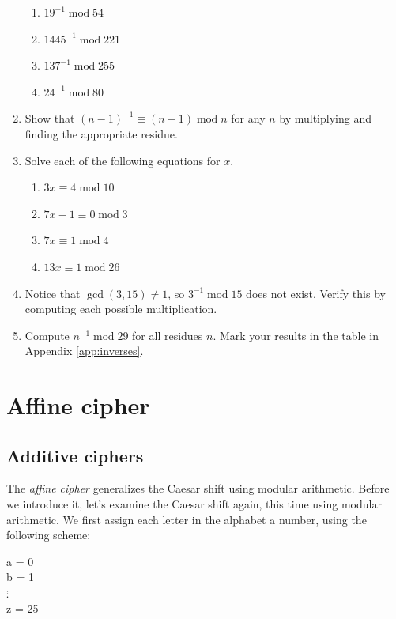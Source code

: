 \documentclass{book}
\theoremstyle{plain}
\theoremstyle{definition}
\newif\ifprintsolutions
\newcommand{\solution}[1]{\ifprintsolutions \begin{sloppypar}{\it #1}\end{sloppypar} \fi} %
\renewcommand{\mod}{\operatorname{mod}}
\renewcommand{\mod}{\operatorname{mod}}
\begin{document}
\begin{enumerate}
\begin{enumerate}
\item $19^{-1} \mod 54$ \solution{$37$}
\item $1445^{-1} \mod 221$ \solution{does not exist}
\item $137^{-1} \mod 255$ \solution{$188$}
\item $24^{-1} \mod 80$ \solution{does not exist}
\end{enumerate}
\item Show that $(n-1)^{-1} \equiv (n-1) \mod n$ for any $n$ by multiplying and finding the appropriate residue.
\item Solve each of the following equations for $x$.
\begin{enumerate}
\item $3x \equiv 4 \mod 10$ \solution{$x \equiv 8 \mod 10$}
\item $7x-1 \equiv 0 \mod 3$ \solution{$x \equiv 1 \mod 3$}
\item $7x \equiv 1 \mod 4$ \solution{$x \equiv 3 \mod 4$}
\item $13x \equiv 1 \mod 26$ \solution{does not exist}
\end{enumerate}
\item Notice that $\gcd(3,15) \neq 1$, so $3^{-1} \mod 15$ does not exist. Verify this by computing each possible multiplication.
\item Compute $n^{-1} \mod 29$ for all residues $n$. Mark your results in the table in Appendix \ref{app:inverses}. \solution{
\def\arraystretch{1.5}
\begin{tabular}{|c|c|c|c|c|c|c|c|c|c|c|c|c|c|c|}
\hline
$n$ & $1$ & $2$ & $3$ & $4$ & $5$ & $6$ & $7$ & $8$ & $9$ & $10$ & $11$ & $12$ & $13$ & $14$ \\
\hline
$n^{-1} \mod 29$ & $1$ & $15$ & $10$ & $22$ & $6$ & $5$ & $25$ & $11$ & $13$ & $3$ & $8$ & $17$ & $9$ & $27$ \\
\hline
$n$ & $15$ & $16$ & $17$ & $18$ & $19$ & $20$ & $21$ & $22$ & $23$ & $24$ & $25$ & $26$ & $27$ & $28$ \\
\hline
$n^{-1} \mod 29$ & $2$ & $20$ & $12$ & $21$ & $26$ & $16$ & $18$ & $4$ & $24$ & $23$ & $7$ & $19$ & $14$ & $28$ \\
\hline
\end{tabular}
\def\arraystretch{1.0}
}
\end{enumerate}

\chapter{Affine cipher}
\section{Additive ciphers}
The {\it affine cipher} generalizes the Caesar shift using modular arithmetic. Before we introduce it, let's examine the Caesar shift again, this time using modular arithmetic. We first assign each letter in the alphabet a number, using the following scheme:
\begin{center}
a = 0 \\
b = 1 \\
$\vdots$ \\
z = 25
\end{center}
\end{document}
